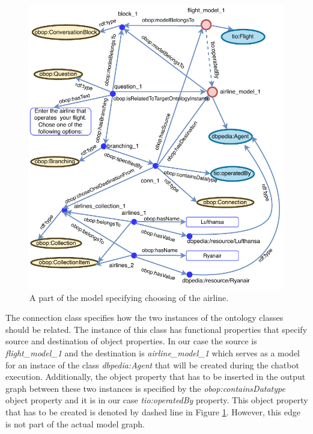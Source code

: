 \documentclass[runningheads]{llncs}
\begin{document}
\begin{figure}[H]
  \centering
  \includegraphics[width=\linewidth]{img/branching_schema}
  \caption{A part of the model specifying choosing of the airline.}
  \label{fig:branching_schema}
\end{figure}

The connection class specifies how the two instances of the ontology classes should be related. The instance of this class has functional properties that specify source and destination of object properties. In our case the source is \textit{flight\_model\_1} and the destination is \textit{airline\_model\_1} which serves as a model for an instace of the class \textit{dbpedia:Agent} that will be created during the chatbot execution. Additionally, the object property that has to be inserted in the output graph between these two instances is specified by the \textit{obop:containsDatatype} object property and it is in our case \textit{tio:operatedBy} property. This object property that has to be created is denoted by dashed line in Figure \ref{fig:branching_schema}. However, this edge is not part of the actual model graph.    
\end{document}
